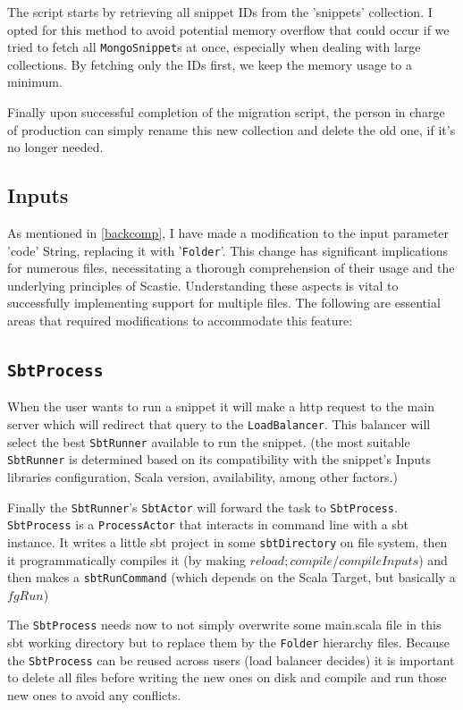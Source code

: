 \documentclass[a4paper,11pt,oneside]{report}
\begin{document}
The script starts by retrieving all snippet IDs from the 'snippets' collection. I opted for this method to avoid potential memory overflow that could occur if we tried to fetch all \lstinline{MongoSnippet}s at once, especially when dealing with large collections. By fetching only the IDs first, we keep the memory usage to a minimum.

Finally upon successful completion of the migration script, the person in charge of production can simply rename this new collection and delete the old one, if it's no longer needed.

\subsection{Inputs}
As mentioned in \ref{backcomp}, I have made a modification to the input parameter 'code' String, replacing it with '\lstinline{Folder}'. This change has significant implications for numerous files, necessitating a thorough comprehension of their usage and the underlying principles of Scastie. Understanding these aspects is vital to successfully implementing support for multiple files. The following are essential areas that required modifications to accommodate this feature:

\subsection{\lstinline{SbtProcess}}
When the user wants to run a snippet it will make a http request to the main server which will redirect that query to the \lstinline{LoadBalancer}. This balancer will select the best \lstinline{SbtRunner} available to run the snippet. (the most suitable \lstinline{SbtRunner} is determined based on its compatibility with the snippet's Inputs libraries configuration, Scala version, availability, among other factors.)

Finally the \lstinline{SbtRunner}'s \lstinline{SbtActor} will forward the task to \lstinline{SbtProcess}. \lstinline{SbtProcess} is a \lstinline{ProcessActor} that interacts in command line with a sbt instance.
It writes a little sbt project in some \lstinline{sbtDirectory} on file system, then it programmatically compiles it (by making $reload;compile/compileInputs$) and then makes a \lstinline{sbtRunCommand} (which depends on the Scala Target, but basically a $fgRun$)

The \lstinline{SbtProcess} needs now to not simply overwrite some main.scala file in this sbt working directory but to replace them by the \lstinline{Folder} hierarchy files. Because the \lstinline{SbtProcess} can be reused across users (load balancer decides) it is important to delete all files before writing the new ones on disk and compile and run those new ones to avoid any conflicts.
\end{document}
